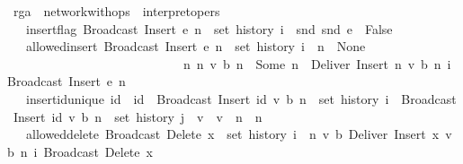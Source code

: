 \documentclass[acmlarge,review,anonymous]{acmart}\settopmatter{printfolios=true}
\begin{document}
\begin{isabellebody}
\isanewline
{}\isamarkupfalse%
\ rga\ {\isacharequal}\ network{\isacharunderscore}with{\isacharunderscore}ops\ {\isacharunderscore}\ interpret{\isacharunderscore}opers\ {\isacharplus}\isanewline
\ \ \ insert{\isacharunderscore}flag{\isacharcolon}\ {\isachardoublequoteopen}Broadcast\ {\isacharparenleft}Insert\ e\ n{\isacharparenright}\ {\isasymin}\ set\ {\isacharparenleft}history\ i{\isacharparenright}\ {\isasymLongrightarrow}\ snd\ {\isacharparenleft}snd\ e{\isacharparenright}\ {\isacharequal}\ False{\isachardoublequoteclose}\isanewline
\ \ \ allowed{\isacharunderscore}insert{\isacharcolon}\ {\isachardoublequoteopen}Broadcast\ {\isacharparenleft}Insert\ e\ n{\isacharparenright}\ {\isasymin}\ set\ {\isacharparenleft}history\ i{\isacharparenright}\ {\isasymLongrightarrow}\ n\ {\isacharequal}\ None\ {\isasymor}\ \isanewline
\ \ \ \ \ \ \ \ \ \ \ \ \ \ \ \ \ \ \ \ \ \ \ \ \ \ \ \ {\isacharparenleft}{\isasymexists}n{\isacharprime}\ n{\isacharprime}{\isacharprime}\ v\ b{\isachardot}\ n\ {\isacharequal}\ Some\ n{\isacharprime}\ {\isasymand}\ Deliver\ {\isacharparenleft}Insert\ {\isacharparenleft}n{\isacharprime}{\isacharcomma}\ v{\isacharcomma}\ b{\isacharparenright}\ n{\isacharprime}{\isacharprime}{\isacharparenright}\ {\isasymsqsubset}\isactrlsup i\ Broadcast\ {\isacharparenleft}Insert\ e\ n{\isacharparenright}{\isacharparenright}{\isachardoublequoteclose}\isanewline
\ \ \ insert{\isacharunderscore}id{\isacharunderscore}unique{\isacharcolon}\ {\isachardoublequoteopen}id{}\ {\isacharequal}\ id{}\ {\isasymLongrightarrow}\ Broadcast\ {\isacharparenleft}Insert\ {\isacharparenleft}id{}{\isacharcomma}\ v{}{\isacharcomma}\ b{}{\isacharparenright}\ n{}{\isacharparenright}\ {\isasymin}\ set\ {\isacharparenleft}history\ i{\isacharparenright}\ {\isasymLongrightarrow}\ Broadcast\ {\isacharparenleft}Insert\ {\isacharparenleft}id{}{\isacharcomma}\ v{}{\isacharcomma}\ b{}{\isacharparenright}\ n{}{\isacharparenright}\ {\isasymin}\ set\ {\isacharparenleft}history\ j{\isacharparenright}\ {\isasymLongrightarrow}\ v{}\ {\isacharequal}\ v{}\ {\isasymand}\ n{}\ {\isacharequal}\ n{}{\isachardoublequoteclose}\isanewline
\ \ \ allowed{\isacharunderscore}delete{\isacharcolon}\ {\isachardoublequoteopen}Broadcast\ {\isacharparenleft}Delete\ x{\isacharparenright}\ {\isasymin}\ set\ {\isacharparenleft}history\ i{\isacharparenright}\ {\isasymLongrightarrow}\ {\isacharparenleft}{\isasymexists}n{\isacharprime}\ v\ b{\isachardot}\ Deliver\ {\isacharparenleft}Insert\ {\isacharparenleft}x{\isacharcomma}\ v{\isacharcomma}\ b{\isacharparenright}\ n{\isacharprime}{\isacharparenright}\ {\isasymsqsubset}\isactrlsup i\ Broadcast\ {\isacharparenleft}Delete\ x{\isacharparenright}{\isacharparenright}{\isachardoublequoteclose}\isanewline
\end{isabellebody}
\end{document}

